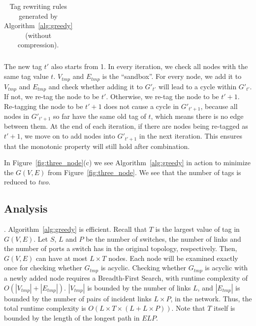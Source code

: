 \begin{table}[t]
{\begin{tabular}{lll}
	\end{tabular}
}
	\caption{Tag rewriting rules generated by Algorithm~\ref{alg:greedy} (without compression).}
	\vspace{-3em}
	\label{table:tagging_table2}
\end{table}

The new tag $t'$ also starts from 1. In every iteration, we check all nodes with
the same tag value $t$. $V_{tmp}$ and $E_{tmp}$ is the ``sandbox''. For every
node, we add it to $V_{tmp}$ and $E_{tmp}$ and check whether adding it to
$G'_{t'}$ will lead to a cycle within $G'_{t'}$. If not, we re-tag the node to
be $t'$. Otherwise, we re-tag the node to be $t'+1$.  Re-tagging the node to be
$t'+1$ does not cause a cycle in $G'_{t'+1}$, because all nodes in $G'_{t'+1}$
so far have the same old tag of $t$, which means there is no edge between them.
At the end of each iteration, if there are nodes being re-tagged as $t'+1$, we
move on to add nodes into $G'_{t'+1}$ in the next iteration.  This ensures that
the monotonic property will still hold after combination.

In Figure~\ref{fig:three_node}(c) we see Algorithm~\ref{alg:greedy} in action to
minimize the $G(V,E)$ from Figure~\ref{fig:three_node}. We see that the number
of tags is reduced to {\em two}.

\subsection {Analysis}
\label{subsec:caveats}

. Algorithm~\ref{alg:greedy} is efficient. Recall that
$T$ is the largest value of tag in $G(V,E)$. Let $S$, $L$ and $P$ be the number 
of switches, the number of links and the number of ports a switch has in the
original topology, respectively. Then, $G(V,E)$ can have at most $L \times T$
nodes.  Each node will be examined exactly once for checking whether $G_{tmp}$
is acyclic.  Checking whether $G_{tmp}$ is acyclic with a newly added node
requires a Breadth-First Search, with runtime complexity of $O(|V_{tmp}| +
|E_{tmp}|)$. $|V_{tmp}|$ is bounded by the number of links $L$, and $|E_{tmp}|$ 
is bounded by the number of pairs of incident links $L \times P$, in the network. Thus,
the total runtime complexity is $O(L \times T \times (L+L \times P))$. Note that $T$
itself is bounded by the length of the longest path in $ELP$.


